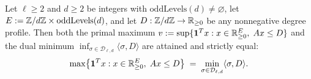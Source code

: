\begin{theorem}
\label{thm:08:lp-duality}
Let $\ell \ge 2$ and $d \ge 2$ be integers with $\mathrm{oddLevels}(d) \neq \varnothing$, let $E := \mathbb{Z}/d\mathbb{Z} \times \mathrm{oddLevels}(d)$, and let $D : \mathbb{Z}/d\mathbb{Z} \to \mathbb{R}_{\ge 0}$ be any nonnegative degree profile. Then both the primal maximum $v := \sup\{\mathbf{1}^T x : x \in \mathbb{R}_{\ge 0}^E,\; A x \le D\}$ and the dual minimum $\inf_{\sigma \in \mathcal{D}_{\ell, d}} \langle \sigma, D \rangle$ are attained and strictly equal:
\begin{equation}
\label{eq:08:strong-duality}
  \max\bigl\{\mathbf{1}^T x : x \in \mathbb{R}_{\ge 0}^E,\; A x \le D\bigr\}
  \;=\; \min_{\sigma \in \mathcal{D}_{\ell, d}} \langle \sigma, D \rangle.
\end{equation}
\end{theorem}

